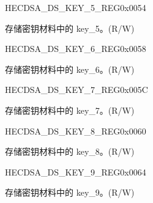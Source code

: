 \begin{register}{H}{ECDSA\_DS\_KEY\_5\_REG}{0x0054}\label{regdesc:ECDSADSKEY5REG}
%
\regnewline%
\begin{regdesc}\begin{reglist}
\label{fielddesc:ECDSADSKEY5}\item [ECDSA\_DS\_KEY\_5] 存储密钥材料中的 key\_5。(R/W)
\end{reglist}\end{regdesc}
\end{register}


\begin{register}{H}{ECDSA\_DS\_KEY\_6\_REG}{0x0058}\label{regdesc:ECDSADSKEY6REG}
%
\regnewline%
\begin{regdesc}\begin{reglist}
\label{fielddesc:ECDSADSKEY6}\item [ECDSA\_DS\_KEY\_6] 存储密钥材料中的 key\_6。(R/W)
\end{reglist}\end{regdesc}
\end{register}


\begin{register}{H}{ECDSA\_DS\_KEY\_7\_REG}{0x005C}\label{regdesc:ECDSADSKEY7REG}
%
\regnewline%
\begin{regdesc}\begin{reglist}
\label{fielddesc:ECDSADSKEY7}\item [ECDSA\_DS\_KEY\_7] 存储密钥材料中的 key\_7。(R/W)
\end{reglist}\end{regdesc}
\end{register}


\begin{register}{H}{ECDSA\_DS\_KEY\_8\_REG}{0x0060}\label{regdesc:ECDSADSKEY8REG}
%
\regnewline%
\begin{regdesc}\begin{reglist}
\label{fielddesc:ECDSADSKEY8}\item [ECDSA\_DS\_KEY\_8] 存储密钥材料中的 key\_8。(R/W)
\end{reglist}\end{regdesc}
\end{register}


\begin{register}{H}{ECDSA\_DS\_KEY\_9\_REG}{0x0064}\label{regdesc:ECDSADSKEY9REG}
%
\regnewline%
\begin{regdesc}\begin{reglist}
\label{fielddesc:ECDSADSKEY9}\item [ECDSA\_DS\_KEY\_9] 存储密钥材料中的 key\_9。(R/W)
\end{reglist}\end{regdesc}
\end{register}


